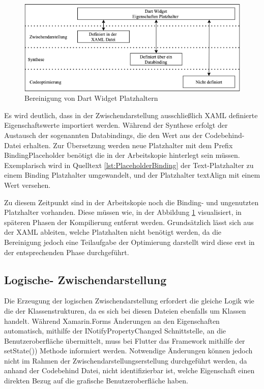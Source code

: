 \newpage
\begin{figure}[!ht]
 \includegraphics[width=\textwidth,keepaspectratio]{Images/Implementation/DartPlaceHolder.png}
 \caption{Bereinigung von Dart Widget Platzhaltern}
 \label{fig:PlaceholderOptions}
\end{figure}
Es wird deutlich, dass in der Zwischendarstellung ausschließlich XAML definierte Eigenschaftswerte 
importiert werden.  Während der Synthese erfolgt der Austausch der sogenannten Databindings, die den Wert aus der Codebehind-Datei erhalten.  Zur Übersetzung werden neue Platzhalter mit dem Prefix \glq BindingPlaceholder \grq{} benötigt die in der Arbeitskopie hinterlegt sein müssen. Exemplarisch wird in Quelltext  \ref{lst:PlaceholderBinding} der Text-Platzhalter zu einem Binding Platzhalter umgewandelt,  und der Platzhalter textAlign mit einem Wert versehen. 

 

Zu diesem Zeitpunkt sind in der Arbeitskopie noch die Binding- und ungenutzten Platzhalter vorhanden.  Diese müssen wie, in der Abbildung \ref{fig:PlaceholderOptions} visualisiert,  in späteren Phasen der Kompilierung entfernt werden.  Grundsätzlich lässt sich aus der XAML ableiten,  welche Platzhalten nicht benötigt werden,  da die Bereinigung jedoch eine Teilaufgabe der Optimierung darstellt wird diese erst in der entsprechenden Phase durchgeführt. 

\subsection{Logische- Zwischendarstellung}

Die Erzeugung der logischen Zwischendarstellung erfordert die gleiche Logik wie die der Klassenstrukturen,  da es sich bei diesen Dateien ebenfalls um \Csharp Klassen handelt.  Während Xamarin.Forms Änderungen an den Eigenschaften automatisch, mithilfe der \glq INotifyPropertyChanged\grq{} Schnittstelle,  an die Benutzeroberfläche übermittelt, muss bei Flutter das Framework mithilfe der \glq setState())\grq{} Methode informiert werden.  Notwendige Änderungen können jedoch nicht im Rahmen der Zwischendarstellungserstellung durchgeführt werden,  da anhand der Codebehind Datei,  nicht identifizierbar ist,  welche Eigenschaft einen direkten Bezug auf die grafische Benutzeroberfläche haben.

